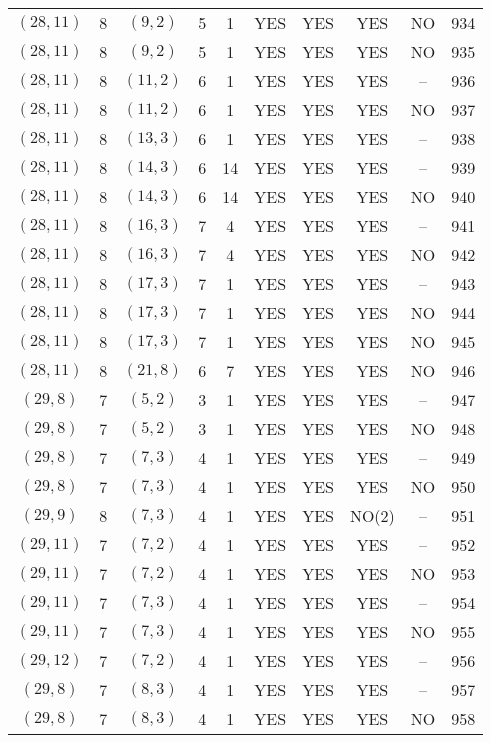 \begin{longtable}{|c|c|c|c|c|c|c|c|c|c|}
$(28, 11)$ & 8 & $(9, 2)$ & 5 & 1 & YES & YES & YES & NO & 934\\
$(28, 11)$ & 8 & $(9, 2)$ & 5 & 1 & YES & YES & YES & NO & 935\\
$(28, 11)$ & 8 & $(11, 2)$ & 6 & 1 & YES & YES & YES & -- & 936\\
$(28, 11)$ & 8 & $(11, 2)$ & 6 & 1 & YES & YES & YES & NO & 937\\
$(28, 11)$ & 8 & $(13, 3)$ & 6 & 1 & YES & YES & YES & -- & 938\\
$(28, 11)$ & 8 & $(14, 3)$ & 6 & 14 & YES & YES & YES & -- & 939\\
$(28, 11)$ & 8 & $(14, 3)$ & 6 & 14 & YES & YES & YES & NO & 940\\
$(28, 11)$ & 8 & $(16, 3)$ & 7 & 4 & YES & YES & YES & -- & 941\\
$(28, 11)$ & 8 & $(16, 3)$ & 7 & 4 & YES & YES & YES & NO & 942\\
$(28, 11)$ & 8 & $(17, 3)$ & 7 & 1 & YES & YES & YES & -- & 943\\
$(28, 11)$ & 8 & $(17, 3)$ & 7 & 1 & YES & YES & YES & NO & 944\\
$(28, 11)$ & 8 & $(17, 3)$ & 7 & 1 & YES & YES & YES & NO & 945\\
$(28, 11)$ & 8 & $(21, 8)$ & 6 & 7 & YES & YES & YES & NO & 946\\
$(29, 8)$ & 7 & $(5, 2)$ & 3 & 1 & YES & YES & YES & -- & 947\\
$(29, 8)$ & 7 & $(5, 2)$ & 3 & 1 & YES & YES & YES & NO & 948\\
$(29, 8)$ & 7 & $(7, 3)$ & 4 & 1 & YES & YES & YES & -- & 949\\
$(29, 8)$ & 7 & $(7, 3)$ & 4 & 1 & YES & YES & YES & NO & 950\\
$(29, 9)$ & 8 & $(7, 3)$ & 4 & 1 & YES & YES & NO(2) & -- & 951\\
$(29, 11)$ & 7 & $(7, 2)$ & 4 & 1 & YES & YES & YES & -- & 952\\
$(29, 11)$ & 7 & $(7, 2)$ & 4 & 1 & YES & YES & YES & NO & 953\\
$(29, 11)$ & 7 & $(7, 3)$ & 4 & 1 & YES & YES & YES & -- & 954\\
$(29, 11)$ & 7 & $(7, 3)$ & 4 & 1 & YES & YES & YES & NO & 955\\
$(29, 12)$ & 7 & $(7, 2)$ & 4 & 1 & YES & YES & YES & -- & 956\\
$(29, 8)$ & 7 & $(8, 3)$ & 4 & 1 & YES & YES & YES & -- & 957\\
$(29, 8)$ & 7 & $(8, 3)$ & 4 & 1 & YES & YES & YES & NO & 958\\

\end{longtable}
